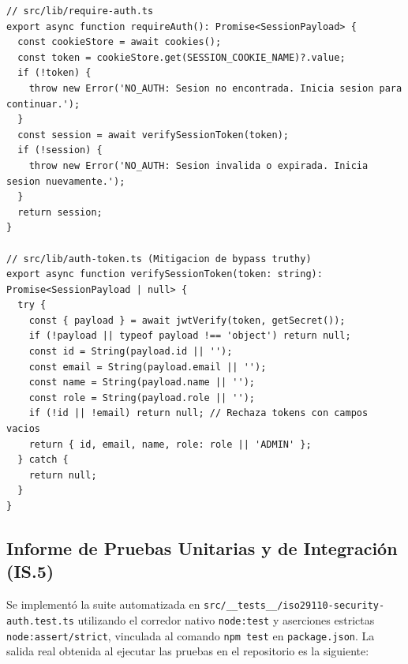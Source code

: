 \documentclass[11pt,a4paper]{article}
\begin{document}
\begin{lstlisting}[caption={Guardián de Autorización \texttt{src/lib/require-auth.ts} y Validación Estricta JWT en \texttt{src/lib/auth-token.ts}}]
// src/lib/require-auth.ts
export async function requireAuth(): Promise<SessionPayload> {
  const cookieStore = await cookies();
  const token = cookieStore.get(SESSION_COOKIE_NAME)?.value;
  if (!token) {
    throw new Error('NO_AUTH: Sesion no encontrada. Inicia sesion para continuar.');
  }
  const session = await verifySessionToken(token);
  if (!session) {
    throw new Error('NO_AUTH: Sesion invalida o expirada. Inicia sesion nuevamente.');
  }
  return session;
}

// src/lib/auth-token.ts (Mitigacion de bypass truthy)
export async function verifySessionToken(token: string): Promise<SessionPayload | null> {
  try {
    const { payload } = await jwtVerify(token, getSecret());
    if (!payload || typeof payload !== 'object') return null;
    const id = String(payload.id || '');
    const email = String(payload.email || '');
    const name = String(payload.name || '');
    const role = String(payload.role || '');
    if (!id || !email) return null; // Rechaza tokens con campos vacios
    return { id, email, name, role: role || 'ADMIN' };
  } catch {
    return null;
  }
}
\end{lstlisting}

\subsection{Informe de Pruebas Unitarias y de Integración (IS.5)}
\label{sec:pruebas}
Se implementó la suite automatizada en \texttt{src/\_\_tests\_\_/iso29110-security-auth.test.ts} utilizando el corredor nativo \texttt{node:test} y aserciones estrictas \texttt{node:assert/strict}, vinculada al comando \texttt{npm test} en \texttt{package.json}. La salida real obtenida al ejecutar las pruebas en el repositorio es la siguiente:
\end{document}

